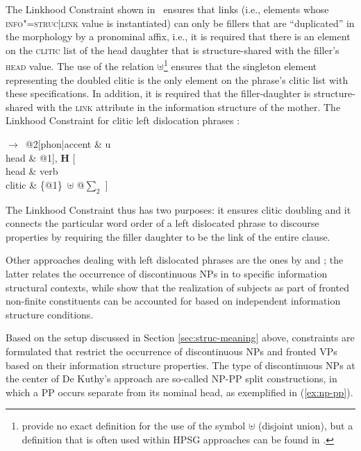 \documentclass[output=paper]{langsci/langscibook}
\begin{document}
The Linkhood Constraint shown in~
ensures that links (i.e., elements whose \textsc{info"=struc|link} value
is instantiated) can only be fillers that are ``duplicated'' in the
morphology by a pronominal affix, i.e., it is required that there is an
element  on the \textsc{clitic} list of the head daughter that is structure-shared with the filler's \textsc{head} value. The use of the  relation $\uplus$\footnote{\citet{AK2002a} provide no exact definition for the use of the symbol $\uplus$ (disjoint union), but a definition that is often used within HPSG approaches can be found in \citet{Manandhar94b-u}.} ensures that the singleton element  representing the doubled clitic is the only element on the phrase's clitic list with these specifications. In addition, it is required that the filler-daughter  is structure-shared with the \textsc{link} attribute in the information structure of the mother. 
\ea
The Linkhood Constraint for clitic left dislocation phrases \citep[238]{AK2002a}:\\
  \centering
  \begin{avm}
$\to$\ 
  @2[phon|accent & u\\
     head & @1], \textbf{H} [\\
                              head & verb\\
                              clitic & \{@1\}\ $\uplus$ @{$\sum_2$} ]
\end{avm}
  \label{fig:clld-constraint}
\z
The Linkhood Constraint thus has two purposes: it ensures clitic
doubling and it connects the particular word order of a left dislocated
phrase to discourse properties by requiring the filler daughter to be
the link of the entire clause.

Other approaches dealing with left dislocated phrases are the ones by
\cite{deKuthy2002a} and \citet{dKM2003a}; the latter relates the
occurrence of discontinuous NPs in \ili{German} to specific
information structural contexts, while \citet{dKM2003a} show that the
realization of subjects as part of fronted non-finite constituents can
be accounted for based on independent information structure
conditions.

Based on the setup discussed in Section \ref{sec:struc-meaning} above,
constraints are formulated that restrict the occurrence of
discontinuous NPs and fronted VPs based on their information structure
properties. The type of discontinuous NPs at the center of De
Kuthy's approach are so-called NP-PP split constructions, in which a PP
occurs separate from its nominal head, as exemplified in
(\ref{ex:np-pp}).
\end{document}
